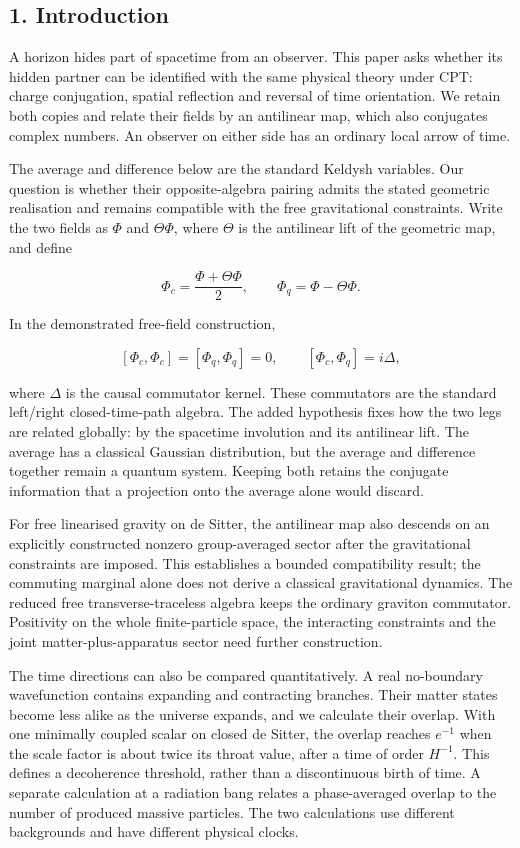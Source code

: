 \documentclass[
]{article}
\begin{document}
\subsection{1. Introduction}\label{introduction}

A horizon hides part of spacetime from an observer. This paper asks
whether its hidden partner can be identified with the same physical
theory under CPT: charge conjugation, spatial reflection and reversal of
time orientation. We retain both copies and relate their fields by an
antilinear map, which also conjugates complex numbers. An observer on
either side has an ordinary local arrow of time.

The average and difference below are the standard Keldysh variables. Our
question is whether their opposite-algebra pairing admits the stated
geometric realisation and remains compatible with the free gravitational
constraints. Write the two fields as \(\Phi\) and \(\Theta\Phi\), where
\(\Theta\) is the antilinear lift of the geometric map, and define

\[
\Phi_c=\frac{\Phi+\Theta\Phi}{2},\qquad
\Phi_q=\Phi-\Theta\Phi.
\]

In the demonstrated free-field construction,

\[
[\Phi_c,\Phi_c]=[\Phi_q,\Phi_q]=0,\qquad
[\Phi_c,\Phi_q]=i\Delta,
\]

where \(\Delta\) is the causal commutator kernel. These commutators are
the standard left/right closed-time-path algebra. The added hypothesis
fixes how the two legs are related globally: by the spacetime involution
and its antilinear lift. The average has a classical Gaussian
distribution, but the average and difference together remain a quantum
system. Keeping both retains the conjugate information that a projection
onto the average alone would discard.

For free linearised gravity on de Sitter, the antilinear map also
descends on an explicitly constructed nonzero group-averaged sector
after the gravitational constraints are imposed. This establishes a
bounded compatibility result; the commuting marginal alone does not
derive a classical gravitational dynamics. The reduced free
transverse-traceless algebra keeps the ordinary graviton commutator.
Positivity on the whole finite-particle space, the interacting
constraints and the joint matter-plus-apparatus sector need further
construction.

The time directions can also be compared quantitatively. A real
no-boundary wavefunction contains expanding and contracting branches.
Their matter states become less alike as the universe expands, and we
calculate their overlap. With one minimally coupled scalar on closed de
Sitter, the overlap reaches \(e^{-1}\) when the scale factor is about
twice its throat value, after a time of order \(H^{-1}\). This defines a
decoherence threshold, rather than a discontinuous birth of time. A
separate calculation at a radiation bang relates a phase-averaged
overlap to the number of produced massive particles. The two
calculations use different backgrounds and have different physical
clocks.
\end{document}
